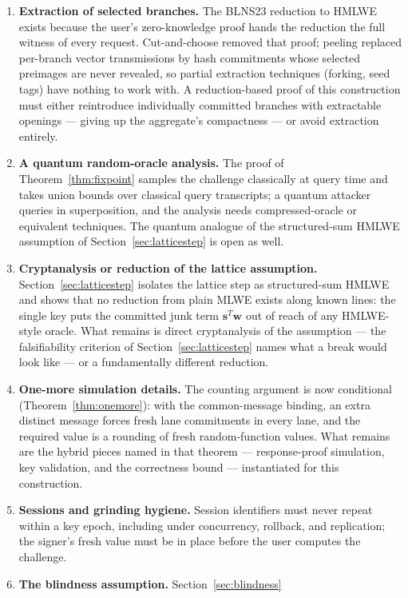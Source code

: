 \documentclass[11pt]{article}
\begin{document}
\begin{enumerate}
 \item \textbf{Extraction of selected branches.}  The BLNS23
reduction to HMLWE exists because the user's zero-knowledge proof hands the
reduction the full witness of every request.  Cut-and-choose removed that
proof; peeling replaced per-branch vector transmissions by hash commitments
whose selected preimages are never revealed, so partial extraction techniques
(forking, seed tags) have nothing to work with.  A reduction-based proof of
this construction must either reintroduce individually committed branches
with extractable openings --- giving up the aggregate's compactness --- or
avoid extraction entirely.
 \item \textbf{A quantum random-oracle analysis.}
The proof of Theorem~\ref{thm:fixpoint} samples the challenge classically at
query time and takes union bounds over classical query transcripts; a quantum
attacker queries in superposition, and the analysis needs compressed-oracle
or equivalent techniques.  The quantum analogue of the structured-sum HMLWE
assumption of Section~\ref{sec:latticestep} is open as well.
 \item \textbf{Cryptanalysis or reduction of the lattice assumption.}
Section~\ref{sec:latticestep} isolates the lattice step as structured-sum
HMLWE and shows that no reduction from plain MLWE exists along known lines:
the single key puts the committed junk term $\mathbf s^{T}\mathbf w$ out of
reach of any HMLWE-style oracle.  What remains is direct cryptanalysis of the
assumption --- the falsifiability criterion of
Section~\ref{sec:latticestep} names what a break would look like --- or a
fundamentally different reduction.
 \item \textbf{One-more simulation details.}  The counting argument is now
conditional (Theorem~\ref{thm:onemore}): with the common-message binding, an
extra distinct message forces fresh lane commitments in every lane, and the
required value is a rounding of fresh random-function values.  What remains
are the hybrid pieces named in that theorem --- response-proof simulation,
key validation, and the correctness bound --- instantiated for this
construction.
 \item \textbf{Sessions and grinding hygiene.}  Session identifiers must never
repeat within a key epoch, including under concurrency, rollback, and
replication; the signer's fresh value must be in place before the user
computes the challenge.
 \item \textbf{The blindness assumption.}  Section~\ref{sec:blindness}

\end{enumerate}
\end{document}
